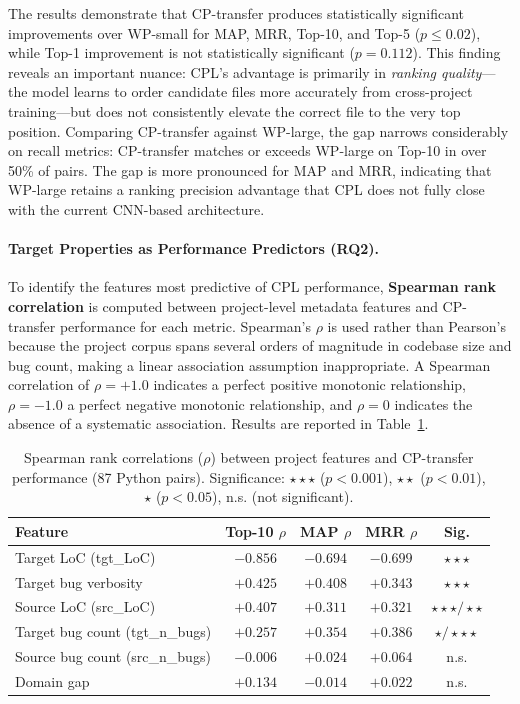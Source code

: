\documentclass[12pt,table,xcdraw]{article}
\begin{document}
The results demonstrate that CP-transfer produces statistically significant improvements over WP-small for MAP, MRR, Top-10, and Top-5 ($p \leq 0.02$), while Top-1 improvement is not statistically significant ($p = 0.112$). This finding reveals an important nuance: CPL's advantage is primarily in \textit{ranking quality}---the model learns to order candidate files more accurately from cross-project training---but does not consistently elevate the correct file to the very top position. Comparing CP-transfer against WP-large, the gap narrows considerably on recall metrics: CP-transfer matches or exceeds WP-large on Top-10 in over 50\% of pairs. The gap is more pronounced for MAP and MRR, indicating that WP-large retains a ranking precision advantage that CPL does not fully close with the current CNN-based architecture.

\paragraph{Target Properties as Performance Predictors (RQ2).}
To identify the features most predictive of CPL performance, \textbf{Spearman rank correlation} is computed between project-level metadata features and CP-transfer performance for each metric. Spearman's $\rho$ is used rather than Pearson's because the project corpus spans several orders of magnitude in codebase size and bug count, making a linear association assumption inappropriate. A Spearman correlation of $\rho = +1.0$ indicates a perfect positive monotonic relationship, $\rho = -1.0$ a perfect negative monotonic relationship, and $\rho = 0$ indicates the absence of a systematic association. Results are reported in Table~\ref{tab:spearman}.

\begin{table}[h]
\centering
\caption{Spearman rank correlations ($\rho$) between project features and CP-transfer performance (87 Python pairs). Significance: $\star\star\star$ ($p < 0.001$), $\star\star$ ($p < 0.01$), $\star$ ($p < 0.05$), n.s. (not significant).}
\label{tab:spearman}
\begin{tabular}{|l|c|c|c|c|}
\hline
\textbf{Feature} & \textbf{Top-10 $\rho$} & \textbf{MAP $\rho$} & \textbf{MRR $\rho$} & \textbf{Sig.} \\ \hline
Target LoC (tgt\_LoC)               & $-0.856$ & $-0.694$ & $-0.699$ & $\star\star\star$ \\ \hline
Target bug verbosity                & $+0.425$ & $+0.408$ & $+0.343$ & $\star\star\star$ \\ \hline
Source LoC (src\_LoC)               & $+0.407$ & $+0.311$ & $+0.321$ & $\star\star\star / \star\star$ \\ \hline
Target bug count (tgt\_n\_bugs)     & $+0.257$ & $+0.354$ & $+0.386$ & $\star / \star\star\star$ \\ \hline
Source bug count (src\_n\_bugs)     & $-0.006$ & $+0.024$ & $+0.064$ & n.s. \\ \hline
Domain gap                          & $+0.134$ & $-0.014$ & $+0.022$ & n.s. \\ \hline
\end{tabular}
\end{table}
\end{document}
